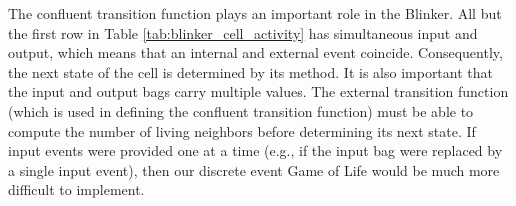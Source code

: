 The confluent transition function plays an important role in the Blinker. All but the first row in Table \ref{tab:blinker_cell_activity} has simultaneous input and output, which means that an internal and external event coincide. Consequently, the next state of the cell is determined by its  method. It is also important that the input and output bags carry multiple values. The external transition function (which is used in defining the confluent transition function) must be able to compute the number of living neighbors before determining its next state. If input events were provided one at a time (e.g., if the input bag were replaced by a single input event), then our discrete event Game of Life would be much more difficult to implement.
